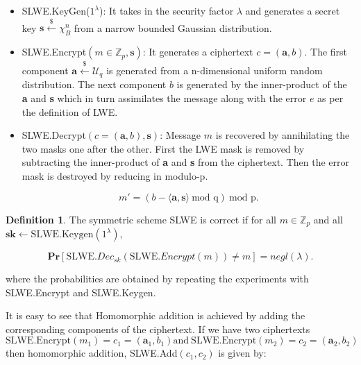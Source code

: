 \documentclass[10pt,journal,compsoc]{IEEEtran}
\theoremstyle{definition}
\newtheorem{definition}{Definition}[section]
\begin{document}
 \begin{itemize}
 
 \item SLWE.KeyGen($1^\lambda$): It takes in the security factor $\lambda$ and generates a secret key $\textbf{s} \xleftarrow{\$} \chi_B^n $ from a narrow bounded Gaussian distribution.
 
 \item SLWE.Encrypt$\left( m \in \mathbb{Z}_p, \textbf{s}\right)$: It generates a ciphertext $c = \left( \textbf{a}, b \right)$. The first component $\textbf{a} \xleftarrow{\$} \mathcal{U}_q$ is generated from a n-dimensional uniform random distribution. The next component $b$ is generated by the inner-product of the \textbf{a} and \textbf{s} which in turn assimilates the message along with the error $e$ as per the definition of LWE.   
 
\item SLWE.Decrypt$\left(c = \left(\textbf{a},b\right), \textbf{s}\right)$: Message $m$ is recovered by annihilating the two masks one after the other. First the LWE mask is removed by subtracting the inner-product of \textbf{a} and \textbf{s} from the ciphertext. Then the error mask is destroyed by reducing in modulo-p.

$$m' =\left(  b - \langle \textbf{a},\textbf{s} \rangle \ \textrm{mod q} \right) \ \textrm{mod p}.$$ 
 \end{itemize}
 
\begin{definition}

The symmetric scheme SLWE is correct if for all $m \in \mathbb{Z}_p$ and all $\textbf{sk} \leftarrow \textrm{SLWE.Keygen}\left( 1^\lambda\right)$,

$$\textbf{Pr}\left[ \textrm{SLWE.}Dec_{sk}\left( \textrm{SLWE.}Encrypt\left( m\right)\right) \neq m \right] = negl\left(\lambda\right).$$

where the probabilities are obtained by repeating the experiments with SLWE.Encrypt and SLWE.Keygen. 

\end{definition}

It is easy to see that Homomorphic addition is achieved by adding the corresponding components of the ciphertext. If we have two ciphertexts $\textrm{SLWE.Encrypt}\left( m_1\right)= c_1 = \left( \textbf{a}_1, b_1 \right) \textrm{and} \ \textrm{SLWE.Encrypt}\left( m_2\right)= c_2 = \left( \textbf{a}_2, b_2 \right)$ then homomorphic addition, SLWE.Add$\left(c_1,c_2\right)$ is given by:
\end{document}
